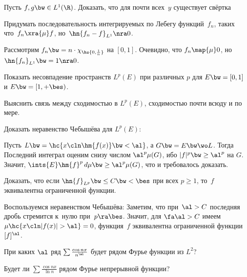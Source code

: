 \documentclass[a4paper,draft]{article}
\begin{document}
\begin{problem}
  Пусть $f, g\bw\in L^1(\R)$. Доказать, что для почти всех~$y$ существует свёртка
\end{problem}

\begin{problem}
  Придумать последовательность интегрируемых по Лебегу функций~$f_n$, таких что~$f_n\xra{\mu} f$,
  но~$\hn{f_n - f}_{L^1} \nra 0$.
\end{problem}
\begin{solution}
  Рассмотрим $f_n \bw= n\cdot \chi_{\hs{0,\frac1n}}$ на $[0,1]$. Очевидно, что $f_n\map{\mu} 0$,
  но $\hn{f_n}_{L^1} \bw= 1 \nra 0$.
\end{solution}

\begin{problem}
  Показать несовпадение пространств $L^p(E)$ при различных $p$ для $E\bw=[0,1]$ и $E \bw= [1, +\bes)$.
\end{problem}

\begin{problem}
  Выяснить связь между сходимостью в $L^p(E)$, сходимостью почти всюду и по мере.
\end{problem}

\begin{problem}
  Доказать неравенство Чебышёва для $L^p(E)$:
\end{problem}
\begin{solution}
  Пусть $L \bw= \hc{x\cln \hm{f(x)} \bw< \al}$, а $G \bw= E \bw\wo L$. Тогда
  Последний интеграл оценим снизу числом $\al^p \mu(G)$, ибо $|f|^p \bw\ge \al^p$ на $G$.
  Значит, $\ints{E} \hm{f}^p\,d\mu \bw\ge \al^p \mu(G)$, что и требовалось доказать.
\end{solution}

\begin{problem}
  Доказать, что если $\hn{f}_{L^p} \bw\le C \bw< \bes$ при всех $p \ge 1$, то~$f$
  эквивалентна ограниченной функции.
\end{problem}
\begin{solution}
  Воспользуемся неравенством Чебышёва:
  Заметим, что при~$\al > C$ последняя дробь стремится к~нулю при~$p\ra\bes$. Значит,
  для $\fa \al > C$ имеем $\mu\hc{x\cln |f(x)| > \al} = 0$,
   функция~$f$ эквивалентна ограниченной функции~$[f]^\al$.
\end{solution}

\begin{problem}
  При каких $\al$ ряд $\sum \frac{\cos nx}{n^{\al}}$ будет рядом Фурье функции из $L^2$?
\end{problem}

\begin{problem}
  Будет ли $\sum \frac{\cos nx}{\ln n}$ рядом Фурье непрерывной функции?
\end{problem}

\medskip\dmvntrail
\end{document}

